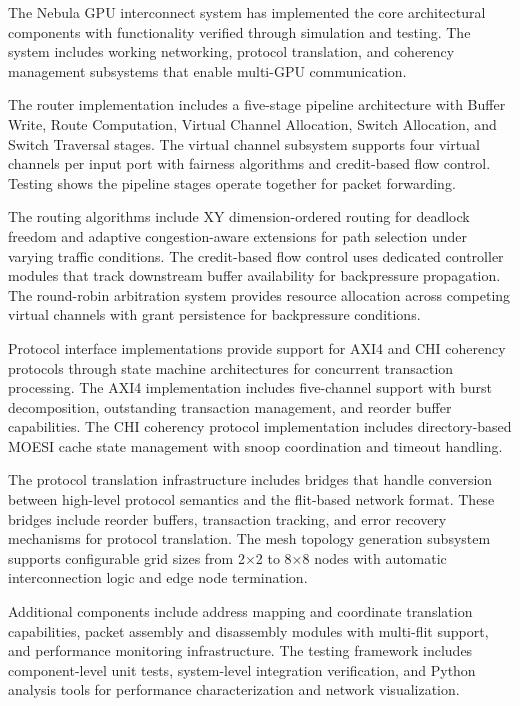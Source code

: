 \documentclass[12pt,letterpaper]{article}
\begin{document}
The Nebula GPU interconnect system has implemented the core architectural components with functionality verified through simulation and testing. The system includes working networking, protocol translation, and coherency management subsystems that enable multi-GPU communication.

The router implementation includes a five-stage pipeline architecture with Buffer Write, Route Computation, Virtual Channel Allocation, Switch Allocation, and Switch Traversal stages. The virtual channel subsystem supports four virtual channels per input port with fairness algorithms and credit-based flow control. Testing shows the pipeline stages operate together for packet forwarding.

The routing algorithms include XY dimension-ordered routing for deadlock freedom and adaptive congestion-aware extensions for path selection under varying traffic conditions. The credit-based flow control uses dedicated controller modules that track downstream buffer availability for backpressure propagation. The round-robin arbitration system provides resource allocation across competing virtual channels with grant persistence for backpressure conditions.

Protocol interface implementations provide support for AXI4 and CHI coherency protocols through state machine architectures for concurrent transaction processing. The AXI4 implementation includes five-channel support with burst decomposition, outstanding transaction management, and reorder buffer capabilities. The CHI coherency protocol implementation includes directory-based MOESI cache state management with snoop coordination and timeout handling.

The protocol translation infrastructure includes bridges that handle conversion between high-level protocol semantics and the flit-based network format. These bridges include reorder buffers, transaction tracking, and error recovery mechanisms for protocol translation. The mesh topology generation subsystem supports configurable grid sizes from 2×2 to 8×8 nodes with automatic interconnection logic and edge node termination.

Additional components include address mapping and coordinate translation capabilities, packet assembly and disassembly modules with multi-flit support, and performance monitoring infrastructure. The testing framework includes component-level unit tests, system-level integration verification, and Python analysis tools for performance characterization and network visualization.
\end{document}
